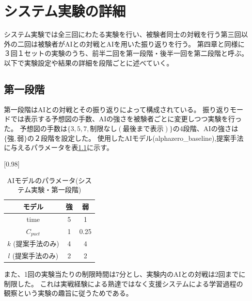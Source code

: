 \chapter{システム実験の詳細}
\label{chap:system}
システム実験では全三回にわたる実験を行い、被験者同士の対戦を行う第三回以外の二回は被験者がAIとの対戦とAIを用いた振り返りを行う。
第四章と同様に３回１セットの実験のうち、前半二回を第一段階・後半一回を第二段階と呼ぶ。
以下で実験設定や結果の詳細を段階ごとに述べていく。
\section{第一段階}
第一段階はAIとの対戦とその振り返りによって構成されている。
振り返りモードでは表示する予想図の手数、AIの強さを被験者ごとに変更しつつ実験を行った。
予想図の手数は$\{3, 5, 7, 制限なし(最後まで表示)\}$の4段階、AIの強さは$\{強,弱\}$の２段階を設定した。
使用したAIモデル(alphazero\_baseline),提案手法に与えるパラメータを表\ref{table:param-system}に示す。
\begin{table}[H]
	\caption{AIモデルのパラメータ(システム実験・第一段階)}
	\centering
	\scalebox{0.98}[0.98]{
		\begin{tabular}{c|c|c}
			モデル&強&弱\\\hline
			time    & 5 & 1 \\ 
			$C_{puct}$ & 1   & 0.25 \\
			$k$ (提案手法のみ)     & 4 & 4 \\
			$l$ (提案手法のみ)     & 2 & 2 \\

		\end{tabular}
	}
	\label{table:param-system}
\end{table}
また、1回の実験当たりの制限時間は7分とし、実験内のAIとの対戦は2回までに制限した。
これは実戦経験による熟達ではなく支援システムによる学習過程の観察という実験の趣旨に従うためである。
